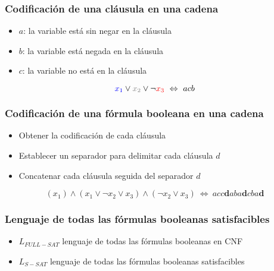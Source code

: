 \documentclass{beamer}
\begin{document}
\begin{frame}
    \frametitle{Codificación de una cláusula en una cadena}
    
    \begin{itemize}
        \item $a$: la variable está sin negar en la cláusula
              \pause
        \item $b$: la variable está negada en la cláusula
              \pause
        \item $c$: la variable no está en la cláusula
    \end{itemize}
    
    \pause
    
    \begin{Large}

        $$\textcolor{blue}{x_1}\vee \textcolor{gray}{x_2}\vee \neg \textcolor{red}{x_3}\ \Leftrightarrow\ acb$$
        
    \end{Large}
    
\end{frame}

\begin{frame}
    \frametitle{Codificación de una fórmula booleana en una cadena}
    
    \begin{itemize}
        \item Obtener la codificación de cada cláusula
              \pause
        \item Establecer un separador para delimitar cada cláusula $d$
              \pause
        \item Concatenar cada cláusula seguida del separador $d$
    \end{itemize}
    \pause
    \vspace{1cm}
    
    \begin{Large}
        $$(x_1)\wedge(x_1\vee \neg x_2 \vee x_3) \wedge (\neg x_2\vee x_3)\ \Leftrightarrow\ acc\mathbf{d}aba\mathbf{d}cba\mathbf{d}$$
    \end{Large}
\end{frame}

\begin{frame}
    \frametitle{Lenguaje de todas las fórmulas booleanas satisfacibles}
    
    \begin{itemize}
        \item $L_{FULL-SAT}$ lenguaje de todas las fórmulas booleanas en CNF
              \pause
        \item  $L_{S-SAT}$ lenguaje de todas las fórmulas booleanas satisfacibles
    \end{itemize}
\end{frame}
\end{document}

